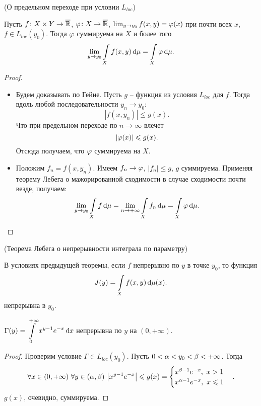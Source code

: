 \begin{theorem}(О предельном переходе при условии $L_{loc}$)

    Пусть $f \colon X \times Y \to \overline{\mathbb{R}}$, $\varphi \colon X \to \overline{\mathbb{R}}$, $\lim_{y \to y_0}{f(x, y)} = \varphi(x)$
    при почти всех $x$, $f \in L_{loc}(y_0)$. Тогда $\varphi$ суммируема на $X$ и более того
    \[
        \lim_{y \to y_0}{\int\limits_X{f(x, y) \,\mathrm{d} \mu}} = \int\limits_X{\varphi \,\mathrm{d} \mu}
    .\]
\end{theorem}
\begin{proof}
    \enewline
    \begin{itemize}
        \item Будем доказывать по Гейне. Пусть $g$ -- функция из условия $L_{loc}$ для $f$.
            Тогда вдоль любой последовательности $y_n \to y_0$:
            \[
                |f(x, y_n)| \leqslant g(x)
            .\]
            Что при предельном переходе по $n \to \infty$ влечет
            \[
                |\varphi(x)| \leqslant g(x) 
            .\]
            Отсюда получаем, что $\varphi$ суммируема на $X$.
        \item Положим $f_n = f(x, y_n)$. Имеем $f_n \to \varphi$, $|f_n| \leqslant g$, $g$
            суммируема. Применяя теорему Лебега о мажорированной сходимости в случае
            сходимости почти везде, получаем:
            \[
                \lim_{y \to y_0}{\int\limits_X{f \,\mathrm{d} \mu}} = \lim_{n \to +\infty}{\int\limits_X{f_n \,\mathrm{d} \mu}} 
                = \int\limits_X{\varphi \,\mathrm{d} \mu}
            .\]
    \end{itemize}
\end{proof}

\begin{corollary}(Теорема Лебега о непрерывности интеграла по параметру)

    В условиях предыдущей теоремы, если $f$ непрерывно по $y$ в точке $y_0$, то функция
    \[
        \displaystyle J(y) = \int\limits_X{f(x, y) \,\mathrm{d} \mu(x)} 
    .\] 
    непрерывна в $y_0$.
\end{corollary}

\begin{example}
    $\displaystyle \Gamma(y) = \int\limits_0^{+\infty}{x^{y - 1} e^{-x} \,\mathrm{d} x}$ непрерывна по $y$ на $(0, +\infty)$.
\end{example}
\begin{proof}
    Проверим условие $\Gamma \in L_{loc}(y_0)$. Пусть $0 < \alpha < y_0 < \beta < +\infty$. Тогда
    \[
        \forall x \in (0, +\infty)~ \forall y \in (\a, \b)~ \abs*{x^{y - 1}e^{-x}} 
        \leqslant g(x) = \begin{cases}
            x^{\b - 1} e^{-x},~ x > 1 \\
            x^{\a - 1} e^{-x},~ x \leqslant  1
        \end{cases}
    .\]
    $g(x)$, очевидно, суммируема.
\end{proof}

